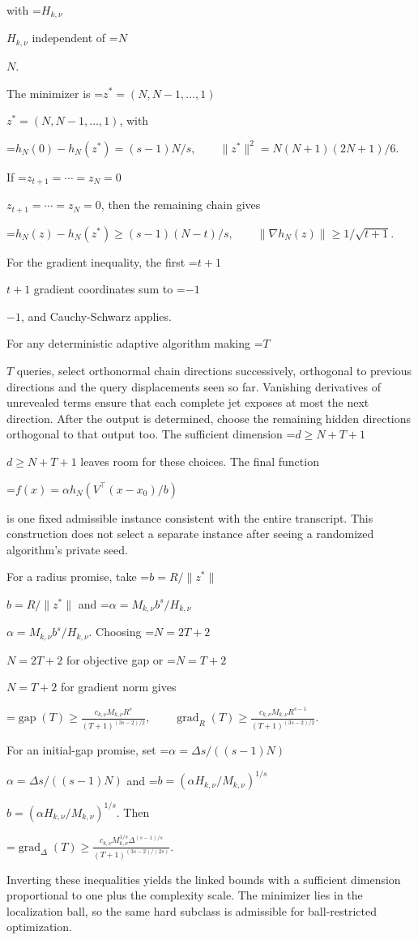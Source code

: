\documentclass[10pt,a4paper]{article}
\newcommand{\AtlasMath}[1]{\par\begingroup\centering\setbox0=\hbox{$\displaystyle #1$}\ifdim\wd0>1.4\linewidth\typeout{ATLAS WIDE FORMULA: \the\wd0}\fi\ifdim\wd0>\linewidth\resizebox{\linewidth}{!}{\box0}\else\box0\fi\par\endgroup}
\newcommand{\AtlasInlineMath}[1]{\begingroup\setbox0=\hbox{$#1$}\ifdim\wd0>.4\linewidth\endgroup\AtlasMath{#1}\else\endgroup$#1$\fi}
\begin{document}
with \AtlasInlineMath{H_{k,\nu}} independent of \AtlasInlineMath{N}.

The minimizer is \AtlasInlineMath{z^*=(N,N-1,\ldots,1)}, with

\AtlasMath{h_N(0)-h_N(z^*)=(s-1)N/s,\qquad
\|z^*\|^2=N(N+1)(2N+1)/6.}

If \AtlasInlineMath{z_{t+1}=\cdots=z_N=0}, then the remaining chain gives

\AtlasMath{h_N(z)-h_N(z^*)\ge(s-1)(N-t)/s,\qquad
\|\nabla h_N(z)\|\ge1/\sqrt{t+1}.}

For the gradient inequality, the first \AtlasInlineMath{t+1} gradient coordinates sum to \AtlasInlineMath{-1}, and Cauchy-Schwarz applies.

For any deterministic adaptive algorithm making \AtlasInlineMath{T} queries, select orthonormal chain directions successively, orthogonal to previous directions and the query displacements seen so far. Vanishing derivatives of unrevealed terms ensure that each complete jet exposes at most the next direction. After the output is determined, choose the remaining hidden directions orthogonal to that output too. The sufficient dimension \AtlasInlineMath{d\ge N+T+1} leaves room for these choices. The final function

\AtlasMath{f(x)=\alpha h_N(V^\top(x-x_0)/b)}

is one fixed admissible instance consistent with the entire transcript. This construction does not select a separate instance after seeing a randomized algorithm's private seed.

For a radius promise, take \AtlasInlineMath{b=R/\|z^*\|} and \AtlasInlineMath{\alpha=M_{k,\nu}b^s/H_{k,\nu}}. Choosing \AtlasInlineMath{N=2T+2} for objective gap or \AtlasInlineMath{N=T+2} for gradient norm gives

\AtlasMath{\operatorname{gap}(T)\ge\frac{c_{k,\nu}M_{k,\nu}R^s}{(T+1)^{(3s-2)/2}},\qquad
\operatorname{grad}_R(T)\ge\frac{c_{k,\nu}M_{k,\nu}R^{s-1}}{(T+1)^{(3s-2)/2}}.}

For an initial-gap promise, set \AtlasInlineMath{\alpha=\Delta s/((s-1)N)} and \AtlasInlineMath{b=(\alpha H_{k,\nu}/M_{k,\nu})^{1/s}}. Then

\AtlasMath{\operatorname{grad}_\Delta(T)\ge\frac{c_{k,\nu}M_{k,\nu}^{1/s}\Delta^{(s-1)/s}}{(T+1)^{(3s-2)/(2s)}}.}

Inverting these inequalities yields the linked bounds with a sufficient dimension proportional to one plus the complexity scale. The minimizer lies in the localization ball, so the same hard subclass is admissible for ball-restricted optimization.
\end{document}
